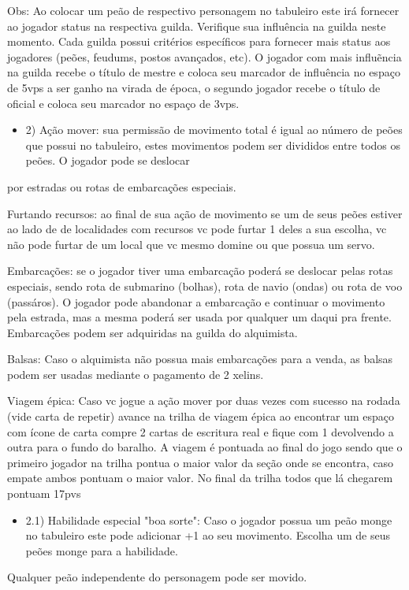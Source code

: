 \documentclass[11pt]{article}
\begin{document}
Obs: Ao colocar um peão de respectivo personagem no tabuleiro este irá fornecer ao jogador status na respectiva guilda. Verifique sua influência na guilda neste momento. Cada guilda possui critérios
específicos para fornecer mais status aos jogadores (peões, feudums, postos avançados, etc). O jogador com mais influẽncia na guilda recebe o título de mestre e coloca seu marcador de influência
no espaço de 5vps a ser ganho na virada de época, o segundo jogador recebe o título de oficial e coloca seu marcador no espaço de 3vps.

\begin{itemize}
\item 2) Ação mover: sua permissão de movimento total é igual ao número de peões que possui no tabuleiro, estes movimentos podem ser divididos entre todos os peões. O jogador pode se deslocar
\end{itemize}
por estradas ou rotas de embarcações especiais.

     Furtando recursos: ao final de sua ação de movimento se um de seus peões estiver ao lado de de localidades com recursos vc pode furtar 1 deles a sua escolha, vc não pode furtar
de um local que vc mesmo domine ou que possua um servo.

     Embarcações: se o jogador tiver uma embarcação poderá se deslocar pelas rotas especiais, sendo rota de submarino (bolhas), rota de navio (ondas) ou rota de voo (passáros). O jogador
pode abandonar a embarcação e continuar o movimento pela estrada, mas a mesma poderá ser usada por qualquer um daqui pra frente. Embarcações podem ser adquiridas na guilda do alquimista.

Balsas: Caso o alquimista não possua mais embarcações para a venda, as balsas podem ser usadas mediante o pagamento de 2 xelins.

     Viagem épica: Caso vc jogue a ação mover por duas vezes com sucesso na rodada (vide carta de repetir) avance na trilha de viagem épica ao encontrar um espaço com ícone de carta
compre 2 cartas de escritura real e fique com 1 devolvendo a outra para o fundo do baralho. A viagem é pontuada ao final do jogo sendo que o primeiro jogador na trilha pontua o maior
valor da seção onde se encontra, caso empate ambos pontuam o maior valor. No final da trilha todos que lá chegarem pontuam 17pvs

\begin{itemize}
\item 2.1) Habilidade especial "boa sorte": Caso o jogador possua um peão monge no tabuleiro este pode adicionar +1 ao seu movimento. Escolha um de seus peões monge para a habilidade.
\end{itemize}
Qualquer peão independente do personagem pode ser movido.
\end{document}
